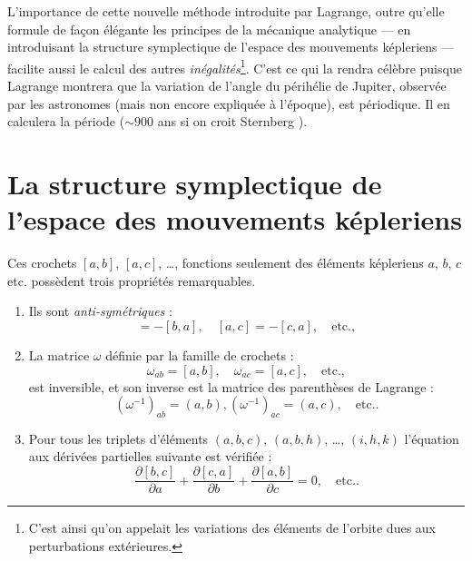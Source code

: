 \documentclass[12pt,paperletter, reqno]{amsart}
\theoremstyle{plain}
\theoremstyle{remark}
\begin{document}
  L'importance de cette nouvelle méthode introduite par Lagrange,
  outre qu'elle formule de façon élégante les principes de la mécanique analytique --- en introduisant la structure symplectique de l'espace des mouvements képleriens --- facilite aussi le calcul des autres \emph{inégalités}\footnote{C'est ainsi qu'on appelait les variations des éléments de l'orbite dues aux perturbations extérieures.}.
  C'est ce qui la rendra célèbre puisque Lagrange montrera que la variation de l'angle du périhélie de Jupiter,
  observée par les astronomes (mais non encore expliquée à l'époque),
  est périodique.
  Il en calculera la période ($\sim 900$ ans si on croit Sternberg \cite{Sternberg1}).
  
  \section{La structure symplectique de l'espace des mouvements képleriens}
  
  Ces crochets $[a,b]$, $[a,c]$, \ldots, fonctions seulement des éléments képleriens $a$, $b$, $c$ etc. possèdent trois propriétés remarquables.
  \begin{enumerate}
    \item Ils sont \emph{anti-symétriques} :
    \begin{equation}
      [a,b] = -[b,a], \quad [a,c] = -[c,a], \quad \mbox{etc.},
    \end{equation}
    \item La matrice $\omega$ définie par la famille de crochets :
    \begin{equation}
      \omega_{ab}=[a,b], \quad \omega_{ac}=[a,c],\quad \mbox{etc.},
    \end{equation}
    est inversible,
    et son inverse est la matrice des parenthèses de Lagrange :
    \begin{equation}
      \left(\omega^{-1}\right)_{ab}=(a,b), \left(\omega^{-1}\right)_{ac}=(a,c), \quad \mbox{etc.}.
    \end{equation}
    \item Pour tous les triplets d'éléments $(a,b,c)$, $(a,b,h)$, \ldots, $(i,h,k)$ l'équation aux dérivées partielles suivante est vérifiée :
    \begin{equation}
      \frac{\partial [b,c]}{\partial a} + \frac{\partial [c,a]}{\partial b} + \frac{\partial [a,b]}{\partial c} =0, \quad \mbox{etc.}.
    \end{equation}
  \end{enumerate}
  
\end{document}
